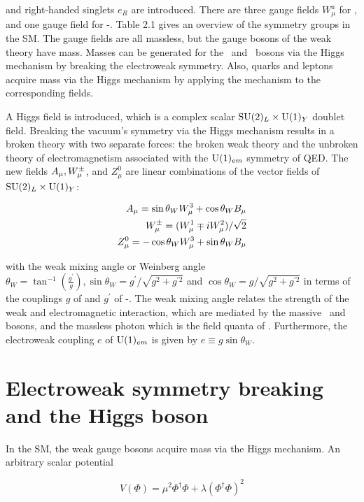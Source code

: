 and right-handed \iso singlets $e_{R}$ are introduced. There are three gauge fields $W_{\mu}^{a}$ for \iso, and one gauge field \bmu for \hyp. Table 2.1 gives an overview of the symmetry groups in the SM. The gauge fields are all massless, but the gauge bosons of the weak theory have mass. Masses can be generated for the \PW\, and \PZ\, bosons via the Higgs mechanism by breaking the electroweak symmetry. Also, quarks and leptons acquire mass via the Higgs mechanism by applying the mechanism to the corresponding fields.

A Higgs field is introduced, which is a complex scalar $\text{SU}(2)_{L} \times \text{U}(1)_{Y}$ doublet field. Breaking the vacuum's symmetry via the Higgs mechanism results in a broken theory with two separate forces: the broken weak theory and the unbroken theory of electromagnetism associated with the $\text{U}(1)_{em}$ symmetry of QED. The new fields $A_{\mu}, W_{\mu}^{\pm}$, and $Z_{\mu}^{0}$ are linear combinations of the vector fields of $\text{SU}(2)_{L} \times \text{U}(1)_{Y}$:

\begin{equation}
  \begin{aligned}
    A_{\mu}=\sin \theta_{W} W_{\mu}^{3}+\cos \theta_{W} B_{\mu} \\
    W_{\mu}^{\pm}=(W_{\mu}^{1} \mp i W_{\mu}^2) / \sqrt{2} \\
    Z_{\mu}^{0}=-\cos \theta_{W} W_{\mu}^{3}+\sin \theta_{W} B_{\mu}
  \end{aligned}
\end{equation}

with the weak mixing angle or Weinberg angle $\theta_{W}=\tan ^{-1}(\frac{g^{\prime}}{g}), \sin \theta_{W}=g^{\prime} / \sqrt{g^2+g^{\prime 2}}$ and $\cos \theta_{W}=g / \sqrt{g^2+g^{\prime 2}}$ in terms of the couplings $g$ of \iso and  $g^{\prime}$ of \hyp. The weak mixing angle relates the strength of the weak and electromagnetic interaction, which are mediated by the massive \PW\, and \PZ\, bosons, and the massless photon which is the field quanta of \amu. Furthermore, the electroweak coupling $e$ of $\text{U}(1)_{em}$ is given by $e \equiv g \sin \theta_{W}$.

\section{Electroweak symmetry breaking and the Higgs boson}
In the SM, the weak gauge bosons acquire mass via the Higgs mechanism. An arbitrary scalar potential

\begin{equation}
  V(\Phi)=\mu^2 \Phi^{\dagger} \Phi+\lambda(\Phi^{\dagger} \Phi)^2
\end{equation}

